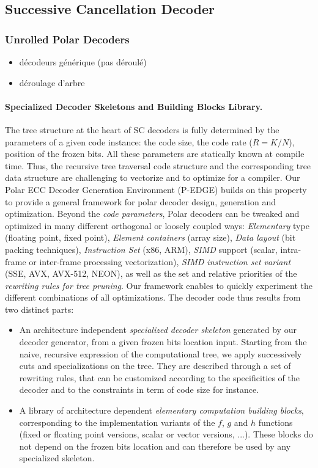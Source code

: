 \subsection{Successive Cancellation Decoder}

\subsubsection{Unrolled Polar Decoders}

\begin{itemize}
  \item décodeurs générique (pas déroulé)
  \item déroulage d'arbre
\end{itemize}

\paragraph{Specialized Decoder Skeletons and Building Blocks Library.}

The tree structure at the heart of SC decoders is fully determined by the
parameters of a given code instance: the code size, the code rate ($R = K / N$),
position of the frozen bits. All these parameters are  statically known at
compile time. Thus, the recursive tree traversal code structure and the
corresponding tree data structure are challenging to vectorize and to optimize
for a compiler. Our Polar ECC Decoder Generation Environment (P-EDGE) builds on
this property to provide a general framework for polar decoder design,
generation and optimization. Beyond the \emph{code parameters}, Polar decoders
can be tweaked and optimized in many different orthogonal or loosely coupled
ways: \emph{Elementary} type (floating point, fixed point),
\emph{Element containers} (array size), \emph{Data layout} (bit packing
techniques), \emph{Instruction Set} (x86, ARM\R), \emph{SIMD} support (scalar,
intra-frame or inter-frame processing vectorization), \emph{SIMD instruction set
variant} (SSE, AVX, AVX-512, NEON), as well as the set and relative priorities
of the \emph{rewriting rules for tree pruning}. Our framework enables to quickly
experiment the different combinations of all optimizations. The decoder code
thus results from two distinct parts:
\begin{itemize}
  \item An architecture independent \emph{specialized decoder skeleton}
    generated by our decoder generator, from a given frozen bits location input.
    Starting from the naive, recursive expression of the computational tree, we
    apply successively cuts and specializations on the tree. They are described
    through a set of rewriting rules, that can be customized according to the
    specificities of the decoder and to the constraints in term of code size for
    instance.
  \item A library of architecture dependent \emph{elementary computation
    building blocks}, corresponding to the implementation variants of the $f$,
    $g$ and $h$ functions (fixed or floating point versions, scalar or vector
    versions, ...). These blocks do not depend on the frozen bits location and
    can therefore be used by any specialized skeleton.
\end{itemize}

